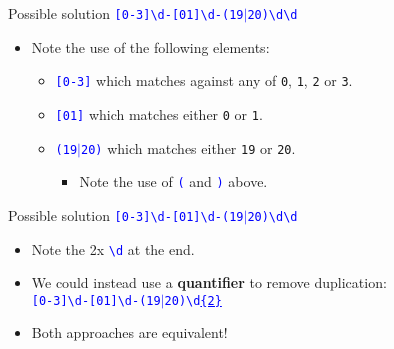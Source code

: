 \documentclass[
	usenames,
	dvipsnames,
] {beamer}
\newcommand{\reDigit}{\textbackslash{}d}
\newcommand{\rePattern}[1]{{\Large\texttt{\textcolor{blue}{#1}}}}
\begin{document}
\begin{frame}{Possible solution}
	\hspace*{3em}
	\rePattern{[0-3]\reDigit-[01]\reDigit-(19$|$20)\reDigit\reDigit}
	\pause
	\bigskip
	
	\begin{itemize}[label=\textbullet]
		\item Note the use of the following elements: \\
		      \pause
		      \medskip
		      \begin{itemize}[label=\textendash]
			      	\item \rePattern{[0-3]} which matches against any of \texttt{0}, \texttt{1}, \texttt{2} or \texttt{3}. \\
			      	      \pause
			      	      \medskip
			      	\item \rePattern{[01]} which matches either \texttt{0} or \texttt{1}. \\
			      	      \pause
			      	      \medskip
			      	\item \rePattern{(19$|$20)} which matches either \texttt{19} or \texttt{20}. \\
					\begin{itemize}
						\item [] \footnotesize Note the use of \rePattern{(} and \rePattern{)} above.
			      		\end{itemize}
		      \end{itemize} 
	\end{itemize}  
\end{frame}
    
\begin{frame}{Possible solution}
	\hspace*{3em}
	\rePattern{[0-3]\reDigit-[01]\reDigit-(19$|$20)\reDigit\reDigit}
		\pause
	\bigskip

	\begin{itemize}[label=\textbullet]
		\item Note the 2x \rePattern{\reDigit} at the end.
		      \pause
		\item We could instead use a \textbf{quantifier} to remove duplication: \\
		      \bigskip
		      \hspace*{3em}
		      \rePattern{[0-3]\reDigit-[01]\reDigit-(19$|$20)\reDigit\underline{\{2\}}}
		      		\pause
		      \bigskip
		\item Both approaches are equivalent!
	\end{itemize}  
\end{frame}
    
\end{document}
